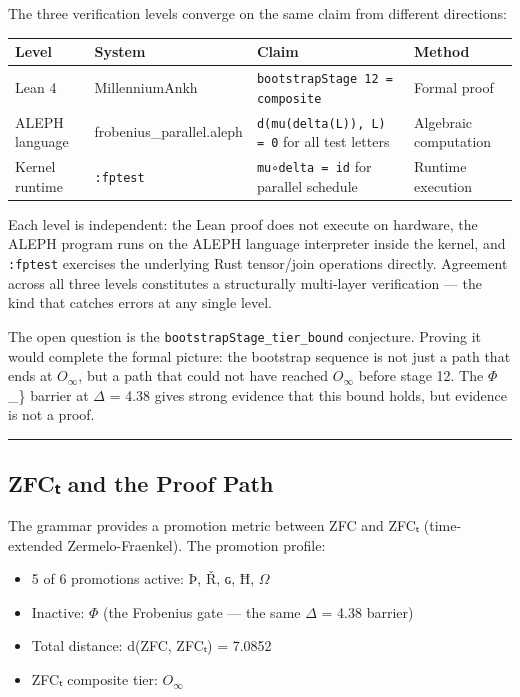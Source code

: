 \documentclass[12pt,a4paper]{article}
\begin{document}
The three verification levels converge on the same claim from different directions:

\begin{table}[htbp]
\centering
\small
{}
\begin{tabularx}{\textwidth}{>{\centering\arraybackslash}X >{\centering\arraybackslash}X >{\centering\arraybackslash}X >{\centering\arraybackslash}X}
\toprule
\rowcolor{gray!25}\textbf{Level} & \textbf{System} & \textbf{Claim} & \textbf{Method} \\
\midrule
\rowcolors{1}{white}{gray!10}
Lean 4 & MillenniumAnkh & \texttt{bootstrapStage 12 = composite} & Formal proof \\
ALEPH language & frobenius\_parallel.aleph & \texttt{d(mu(delta(L)), L) = 0} for all test letters & Algebraic computation \\
Kernel runtime & \texttt{:fptest} & \texttt{mu∘delta = id} for parallel schedule & Runtime execution \\
\bottomrule
\end{tabularx}
\end{table}

Each level is independent: the Lean proof does not execute on hardware, the ALEPH program runs on the ALEPH language interpreter inside the kernel, and \texttt{:fptest} exercises the underlying Rust tensor/join operations directly. Agreement across all three levels constitutes a structurally multi-layer verification --- the kind that catches errors at any single level.

The open question is the \texttt{bootstrapStage\_tier\_bound} conjecture. Proving it would complete the formal picture: the bootstrap sequence is not just a path that ends at $O_{\infty}$, but a path that could not have reached $O_{\infty}$ before stage 12. The $\Phi$\_\} barrier at $\Delta$ = 4.38 gives strong evidence that this bound holds, but evidence is not a proof.

\begin{center}
\rule{0.5\textwidth}{0.4pt}
\end{center}

\subsection{ZFCₜ and the Proof Path}

The grammar provides a promotion metric between ZFC and ZFCₜ (time-extended Zermelo-Fraenkel). The promotion profile:

\begin{itemize}
    \item 5 of 6 promotions active: Þ, Ř, ɢ, Ħ, $\Omega$
    \item Inactive: $\Phi$ (the Frobenius gate --- the same $\Delta$ = 4.38 barrier)
    \item Total distance: d(ZFC, ZFCₜ) = 7.0852
    \item ZFCₜ composite tier: $O_{\infty}$
\end{itemize}
\end{document}
